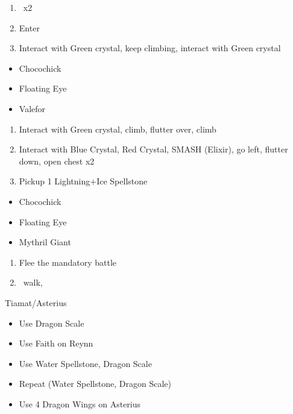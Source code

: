 \begin{enumerate}[resume]
    \item \cs\ x2
    \item Enter 
    \item Interact with Green crystal, keep climbing, interact with Green crystal
\end{enumerate}
\begin{puzzle}
    \begin{itemize}
        \item Chocochick
        \item Floating Eye
        \item Valefor
    \end{itemize}
\end{puzzle}
\begin{enumerate}[resume]
    \item Interact with Green crystal, climb, flutter over, climb
    \item Interact with Blue Crystal, Red Crystal, SMASH (Elixir), go left, flutter down, open chest x2
    \item Pickup 1 Lightning+Ice Spellstone
\end{enumerate}
\begin{puzzle}
    \begin{itemize}
        \item Chocochick
        \item Floating Eye
        \item Mythril Giant
    \end{itemize}
\end{puzzle}
\begin{enumerate}[resume]
    \item Flee the mandatory battle
    \item \cs\, walk, \cs\
\end{enumerate}
\begin{battle}[]{Tiamat/Asterius}
    \begin{itemize}
        \item Use Dragon Scale
        \item Use Faith on Reynn
        \item Use Water Spellstone, Dragon Scale
        \item Repeat (Water Spellstone, Dragon Scale)
        \item Use 4 Dragon Wings on Asterius
    \end{itemize}
\end{battle}
